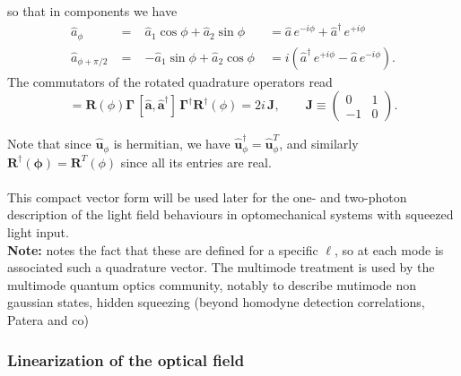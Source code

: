 so that in components we have 
\begin{equation}
\begin{alignedat}{3}
\hat a_\phi \;&=\;& \hat a_1 \cos\phi + \hat a_2 \sin\phi \;&= \hat a\,e^{-i\phi} + \hat a^\dagger\,e^{+i\phi}\\
\hat a_{\phi+\pi/2} \;&=\;& -\hat a_1 \sin\phi + \hat a_2 \cos\phi \;&= i\!\left(\hat a^\dagger\,e^{+i\phi} - \hat a\,e^{-i\phi}\right).
\end{alignedat}
\end{equation}
The commutators of the rotated quadrature operators read
\begin{equation}
[\mathbf{\hat{u}}_\phi , \mathbf{\hat{u}}_\phi^{\dagger}]
= \mathbf R(\phi) \mathbf \Gamma\,[\hat{\mathbf{a}},\hat{\mathbf{a}}^{\dagger}]\, \mathbf \Gamma^{\dagger} \mathbf R^{\dagger}(\phi) = 2i\,\mathbf J, \qquad
\mathbf{J} \equiv
\begin{pmatrix}
0 & 1 \\
-1 & 0
\end{pmatrix}.
\end{equation}

Note that since $\mathbf{\hat{u}}_\phi$ is hermitian, we have $\mathbf{\hat{u}}_\phi^\dagger = \mathbf{\hat{u}}_\phi^T$, and similarly $\mathbf{R^\dagger(\phi)} = \mathbf{R}^T(\phi)$ since all its entries are real. \\ 
\\
This compact vector form will be used later for the one- and two-photon description of the light field behaviours in optomechanical systems with squeezed light input. \\
\noindent \textbf{Note:} \color{red} notes the fact that these are defined for a specific $\ell$, so at each mode is associated such a quadrature vector. The multimode treatment is used by the multimode quantum optics community, notably to describe mutimode non gaussian states, hidden squeezing (beyond homodyne detection correlations, Patera and co) \color{black}
\subsubsection{Linearization of the optical field}

